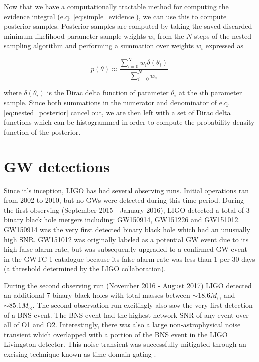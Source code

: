 %
%

Now that we have a computationally tractable method for computing the 
evidence integral (e.q. \ref{eq:simple_evidence}), we can use this 
to compute posterior samples. Posterior samples are computed by 
taking the saved discarded minimum likelihood parameter sample weights $w_i$ from 
the $N$ steps of the nested sampling algorithm and performing 
a summation over weights $w_i$ expressed as

\begin{equation}
    p(\theta) \approx \frac{\sum_{i=0}^{N}w_i\delta( \theta_i)}{\sum_{i=0}^{N} w_i}
    \label{eq:nested_posterior}
\end{equation}

where $\delta(\theta_i)$ is the Dirac delta function of parameter 
$\theta_i$ at the 
$i$th parameter sample. Since both summations in the numerator and 
denominator of e.q. \ref{eq:nested_posterior} cancel out, we are then 
left with a set of Dirac delta functions which can be histogrammed 
in order to compute the probability density function of the posterior.

\section{GW detections}

%
%

Since it's inception, \ac{LIGO} has had several observing runs. 
Initial operations ran from 2002 to 2010, but no \ac{GW}s were 
detected during this time period.
During the first observing (September 2015 - January 2016), 
\ac{LIGO} detected a total of $3$ binary 
black hole mergers including: GW150914, GW151226 and GW151012. GW150914 was 
the very first detected binary black hole which had an unusually high 
\ac{SNR}. GW151012 was originally labeled as a potential GW event due to 
its high false alarm rate, but was subsequently upgraded to a confirmed 
\ac{GW} event in the GWTC-1 catalogue \cite{1811.12907} because its 
false alarm rate was less than 1 per 30 days (a threshold determined 
by the \ac{LIGO} collaboration). 

%
%
During the second observing run (November 2016 - August 2017) 
\ac{LIGO} detected an 
additional $7$ binary black holes with total masses between 
$\sim 18.6 M_\odot$ and $\sim 85.1 M_\odot$. The second observation run 
excitingly also saw the very first detection of a \ac{BNS} event. 
The \ac{BNS} event had the highest network \ac{SNR} of 
any event over all of O1 and O2. Interestingly, there was also 
a large non-astrophysical noise transient which overlapped 
with a portion of the \ac{BNS} event in the \ac{LIGO} Livingston 
detector. This noise transient was successfully mitigated through an 
excising technique known as time-domain gating \cite{PhysRevLett.119.161101}.

